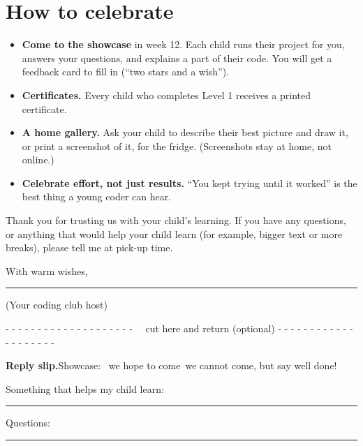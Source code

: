 \documentclass[level=1]{kidscode}
\begin{document}
\section{How to celebrate}
\begin{itemize}[itemsep=3pt]
  \item \textbf{Come to the showcase} in week 12. Each child runs their project for you, answers your
        questions, and explains a part of their code. You will get a feedback card to fill in
        (\enquote{two stars and a wish}).
  \item \textbf{Certificates.} Every child who completes Level 1 receives a printed certificate.
  \item \textbf{A home gallery.} Ask your child to describe their best picture and draw it, or
        print a screenshot of it, for the fridge. (Screenshots stay at home, not online.)
  \item \textbf{Celebrate effort, not just results.} \enquote{You kept trying until it worked} is the
        best thing a young coder can hear.
\end{itemize}

\bigskip
Thank you for trusting us with your child's learning. If you have any questions, or anything that
would help your child learn (for example, bigger text or more breaks), please tell me at pick-up time.

\bigskip
With warm wishes,\par\bigskip
\rule{6cm}{0.4pt}\par
{\small (Your coding club host)}

\vfill
\begin{center}\small\color{kcgrey}
- - - - - - - - - - - - - - - - - - - - \faCut\ \ cut here and return (optional) - - - - - - - - - - - - - - - - - - - -
\end{center}
\noindent\textbf{Reply slip.}\quad Showcase: \tickbox\ we hope to come\quad \tickbox\ we cannot come, but say well done!\par\medskip
\noindent Something that helps my child learn: \rule{8.5cm}{0.4pt}\par\medskip
\noindent Questions: \rule{13cm}{0.4pt}
\end{document}
